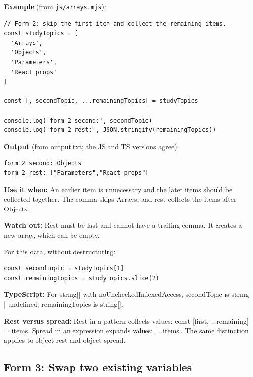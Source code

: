 \documentclass[10pt,a4paper]{article}
\begin{document}

\textbf{Example} (from \texttt{js/\allowbreak{}arrays.\allowbreak{}mjs}):

\begin{lstlisting}[language=GuideJS]
// Form 2: skip the first item and collect the remaining items.
const studyTopics = [
  'Arrays',
  'Objects',
  'Parameters',
  'React props'
]

const [, secondTopic, ...remainingTopics] = studyTopics

console.log('form 2 second:', secondTopic)
console.log('form 2 rest:', JSON.stringify(remainingTopics))
\end{lstlisting}


\textbf{Output} (from output.txt; the JS and TS versions agree):

\begin{lstlisting}[language={}]
form 2 second: Objects
form 2 rest: ["Parameters","React props"]
\end{lstlisting}

\textbf{Use it when:} An earlier item is unnecessary and the later items should be collected together. The comma skips Arrays, and rest collects the items after Objects.

\textbf{Watch out:} Rest must be last and cannot have a trailing comma. It creates a new array, which can be empty.


For this data, without destructuring:

\begin{lstlisting}[language=GuideJS]
const secondTopic = studyTopics[1]
const remainingTopics = studyTopics.slice(2)
\end{lstlisting}

\textbf{TypeScript:} For string[] with noUncheckedIndexedAccess, secondTopic is string | undefined; remainingTopics is string[].

\textbf{Rest versus spread:} Rest in a pattern collects values: const [first, ...remaining] = items. Spread in an expression expands values: [...items]. The same distinction applies to object rest and object spread.

\subsection{Form 3: Swap two existing variables}
\end{document}
